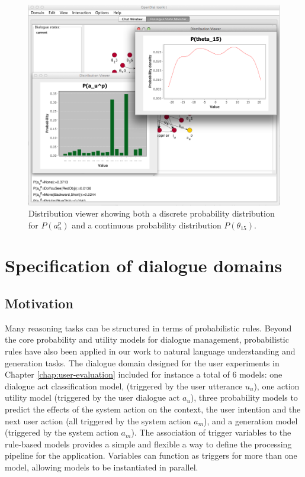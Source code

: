 \begin{figure}[h] 
\begin{center}
\includegraphics[scale=0.40]{imgs/gui-distribviewer.png}
\end{center} 
\caption{Distribution viewer showing both a discrete probability distribution for $P(a_u^p)$ and a continuous probability distribution $P(\theta_{15})$.}
\label{fig:gui-distribviewer}
\end{figure}

\section{Specification of dialogue domains}
\label{sec:domain-specification}

\subsection{Motivation}

Many reasoning tasks can be structured in terms of probabilistic rules.  Beyond the core probability and utility models for dialogue management, probabilistic rules have also been applied in our work to natural language understanding and generation tasks.  The dialogue domain designed for the user experiments in Chapter \ref{chap:user-evaluation} included for instance a total of 6 models: one dialogue act classification model, (triggered by the user utterance $u_u$), one action utility model (triggered by the user dialogue act $a_u$), three probability models to predict the effects of the system action on the context, the user intention and the next user action (all triggered by the system action $a_m$), and a generation model (triggered by the system action $a_m$).  The association of trigger variables to the rule-based models provides a simple and flexible a way to define the processing pipeline for the application.  Variables can function as triggers for more than one model, allowing models to be instantiated in parallel.


